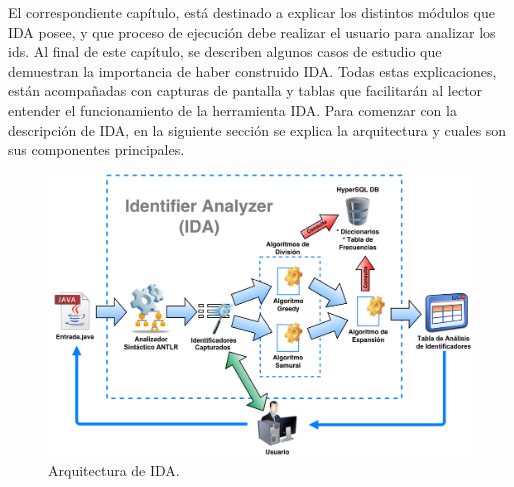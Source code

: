 El correspondiente capítulo, está destinado a explicar los distintos módulos que IDA posee, y que proceso de ejecución debe realizar el usuario para analizar los ids. Al final de este capítulo, se describen algunos casos de estudio que demuestran la importancia de haber construido IDA. Todas estas explicaciones, están acompañadas con capturas de pantalla y tablas que facilitarán al lector entender el funcionamiento de la herramienta IDA. 
Para comenzar con la descripción de IDA, en la siguiente sección se explica la arquitectura y cuales son sus componentes principales.


%



\begin{figure}[t] %
\centerline{%
\includegraphics[scale= 0.35]{./cap4/ida_arq.png}
}
\caption{Arquitectura de IDA.}
\label{arq1}
\end{figure}


